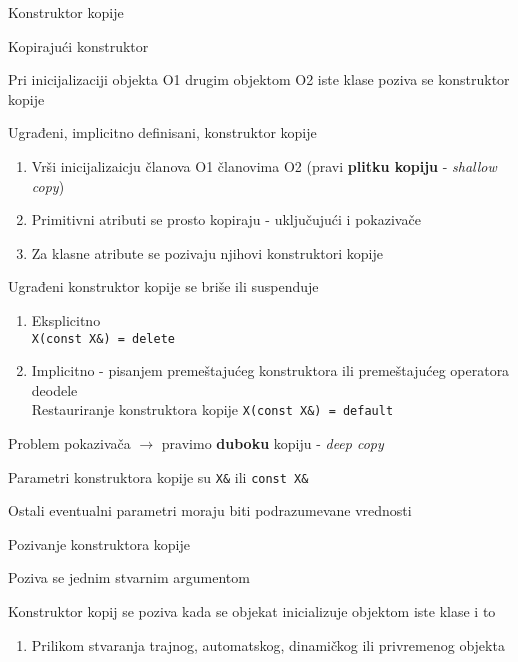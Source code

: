 \documentclass{article}
\newenvironment{xitemize}{%
    
    \itemize
    \larger
}{%
    \enditemize
}
\let\olditemize\itemize
\let\endolditemize\enditemize
\renewenvironment{itemize}{%
    \smaller
    \olditemize
}{%
    \endolditemize
}
\providecommand{\inlinecode}[1]{\texttt{#1}}
\begin{document}
\begin{xitemize}
\begin{itemize}
\end{itemize}
\item Konstruktor kopije
\begin{itemize}
    \item Kopirajući konstruktor
    \item Pri inicijalizaciji objekta O1 drugim objektom O2 iste klase poziva se konstruktor kopije
    \item Ugrađeni, implicitno definisani, konstruktor kopije
    \begin{enumerate}
        \item Vrši inicijalizaicju članova O1 članovima O2 (pravi \textbf{plitku kopiju} - \textit{shallow copy})
        \item Primitivni atributi se prosto kopiraju - uključujući i pokazivače
        \item Za klasne atribute se pozivaju njihovi konstruktori kopije
    \end{enumerate}
    \item Ugrađeni konstruktor kopije se briše ili suspenduje
    \begin{enumerate}
        \item Eksplicitno\\
        \inlinecode{X(const X\&) = delete}
        \item Implicitno - pisanjem premeštajućeg konstruktora ili premeštajućeg operatora deodele\\
        Restauriranje konstruktora kopije \inlinecode{X(const X\&) = default}
    \end{enumerate}
    \item Problem pokazivača $\rightarrow$ pravimo \textbf{duboku} kopiju - \textit{deep copy}
    \item Parametri konstruktora kopije su \inlinecode{X\&} ili \inlinecode{const X\&}
    \item Ostali eventualni parametri moraju biti podrazumevane vrednosti
\end{itemize}
\item Pozivanje konstruktora kopije
\begin{itemize}
    \item Poziva se jednim stvarnim argumentom
    \item Konstruktor kopij se poziva kada se objekat inicializuje objektom iste klase i to
    \begin{enumerate}
        \item Prilikom stvaranja trajnog, automatskog, dinamičkog ili privremenog objekta

\end{enumerate}
\end{itemize}
\end{xitemize}
\end{document}
